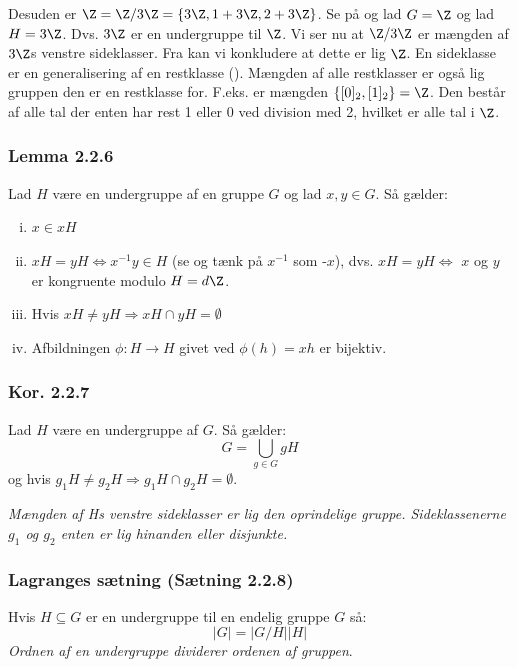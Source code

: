 Desuden er $\Z = \Z/3\Z = \{3\Z, 1 + 3\Z, 2 + 3\Z \}$. Se på  og
lad $G = \Z$ og lad $H = 3\Z$. Dvs. $3\Z$ er en undergruppe til $\Z$. Vi ser nu
at $\Z/3\Z$ er mængden af $3\Z$s venstre sideklasser. Fra  kan
vi konkludere at dette er lig $\Z$. En sideklasse er en generalisering af en
restklasse (). Mængden af alle restklasser er også lig gruppen den
er en restklasse for. F.eks. er mængden $\{[0]_2,[1]_2 \} = \Z$. Den består af alle
tal der enten har rest 1 eller 0 ved division med 2, hvilket er alle tal i $\Z$.

\subsubsection{Lemma 2.2.6}
Lad $H$ være en undergruppe af en gruppe $G$ og lad $x,y \in G$. Så gælder:
\begin{enumerate}[(i)]
  \item $x \in xH$
  \item $xH = yH \iff x^{-1}y \in H$ (se  og tænk på $x^{-1}$ som
  -$x$), dvs. $xH = yH \iff$ $x$ og $y$ er kongruente modulo $H = d\Z$.
  \item Hvis $xH \neq yH \Rightarrow xH \cap yH = \emptyset$
  \item Afbildningen $\phi: H \rightarrow H$ givet ved $\phi(h) = xh$ er
  bijektiv.
\end{enumerate}

\subsubsection{Kor. 2.2.7}
\label{2.2.7}
Lad $H$ være en undergruppe af $G$. Så gælder:
\begin{equation*}
  G = \bigcup_{g \in G} gH
\end{equation*}
og hvis $g_1 H \neq g_2 H \Rightarrow g_1 H \cap g_2 H = \emptyset$.

\textit{Mængden af Hs venstre sideklasser er lig den oprindelige gruppe.
Sideklassenerne $g_1$ og $g_2$ enten er lig hinanden eller disjunkte.}

\subsubsection{Lagranges sætning (Sætning 2.2.8)}
\label{2.2.8}
Hvis $H \subseteq G$ er en undergruppe til en endelig gruppe $G$ så:
\begin{equation*}
  |G| = |G/H||H|
\end{equation*}
\textit{Ordnen af en undergruppe dividerer ordenen af gruppen}.

